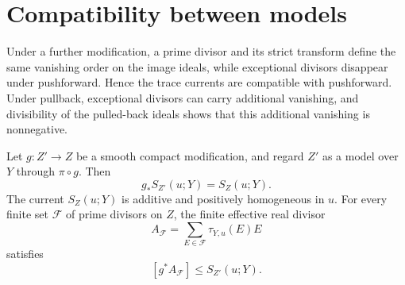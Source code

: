 \section{Compatibility between models}

Under a further modification, a prime divisor and its strict transform define the same vanishing order on the image ideals, while exceptional divisors disappear under pushforward. Hence the trace currents are compatible with pushforward. Under pullback, exceptional divisors can carry additional vanishing, and divisibility of the pulled-back ideals shows that this additional vanishing is nonnegative.

\begin{theorem}\label{thm:trace-divisorial-model-compatibility}
Let $g\colon Z'\to Z$ be a smooth compact modification, and regard $Z'$ as a model over $Y$ through $\pi\circ g$. Then
\[
 g_*S_{Z'}(u;Y)=S_Z(u;Y).
\]
The current $S_Z(u;Y)$ is additive and positively homogeneous in $u$. For every finite set $\mathcal F$ of prime divisors on $Z$, the finite effective real divisor
\[
 A_{\mathcal F}=\sum_{E\in\mathcal F}\tau_{Y,u}(E)E
\]
satisfies
\[
 [g^*A_{\mathcal F}]\leq S_{Z'}(u;Y).
\]
\end{theorem}
